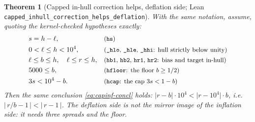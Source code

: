 \documentclass[11pt]{article}
\newtheorem{theorem}{Theorem}
\theoremstyle{definition}
\theoremstyle{remark}
\newcommand{\code}[1]{\texttt{#1}}
\begin{document}
\begin{theorem}[Capped in-hull correction helps, deflation side; Lean \code{capped\_inhull\_\allowbreak correction\_\allowbreak helps\_deflation}]\label{thm:capdef}
With the same notation, assume, quoting the kernel-checked hypotheses exactly:
\begin{align}
& s = h - \ell, && \text{\small\textup{(\code{hs})}} \label{eq:capdef-hyp}\\
& 0 < \ell \le h < 10^4, && \text{\small\textup{(\code{\_hlo}, \code{\_hle}, \code{\_hhi}: hull strictly below unity)}} \nonumber\\
& \ell \le b \le h, \quad \ell \le r \le h, && \text{\small\textup{(\code{hb1}, \code{hb2}, \code{hr1}, \code{hr2}: bias and target in-hull)}} \nonumber\\
& 5000 \le b, && \text{\small\textup{(\code{hfloor}: the floor $b \ge 1/2$)}} \nonumber\\
& 3s < 10^4 - b . && \text{\small\textup{(\code{hcap}: the cap $3s < 1 - b$)}} \nonumber
\end{align}
Then the same conclusion \eqref{eq:capinf-concl} holds: $\bigl|r - b\bigr| \cdot 10^4 < \bigl|r - 10^4\bigr| \cdot b$, i.e.\ $\bigl|\,r/b - 1\,\bigr| < \bigl|\,r - 1\,\bigr|$. The deflation side is \emph{not} the mirror image of the inflation side: it needs three spreads and the floor.
\end{theorem}
\end{document}
